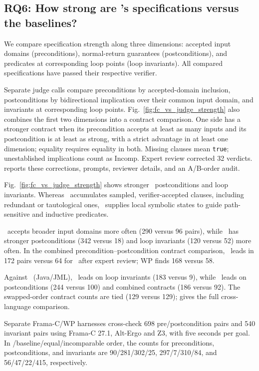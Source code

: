 \subsection{RQ6: How strong are \toolname's specifications versus the baselines?}
\label{subsec:rq6-strength}

{We compare specification strength along three dimensions: accepted input domains (preconditions), normal-return guarantees (postconditions), and predicates at corresponding loop points (loop invariants). All compared specifications have passed their respective verifier.}

\smallskip
{}
{Separate judge calls compare preconditions by accepted-domain inclusion, postconditions by bidirectional implication over their common input domain, and invariants at corresponding loop points. Fig.~\ref{fig:fc_vs_judge_strength} also combines the first two dimensions into a contract comparison. One side has a stronger contract when its precondition accepts at least as many inputs and its postcondition is at least as strong, with a strict advantage in at least one dimension; equality requires equality in both. Missing clauses mean \texttt{true}; unestablished implications count as Incomp. Expert review corrected 32 verdicts.  reports these corrections, prompts, reviewer details, and an A/B-order audit.}

{Fig.~\ref{fig:fc_vs_judge_strength} shows stronger \toolname\ postconditions and loop invariants. Whereas \autospec\ accumulates sampled, verifier-accepted clauses, including redundant or tautological ones, \toolname\ supplies local symbolic states to guide path-sensitive and inductive predicates.}

{\autospec\ accepts broader input domains more often (290 versus 96 pairs), while \toolname\ has stronger postconditions (342 versus 18) and loop invariants (120 versus 52) more often. In the combined precondition--postcondition contract comparison, \toolname\ leads in 172 pairs versus 64 for \autospec\ after expert review; WP finds 168 versus 58.}

{Against \specgen\ (Java/JML), \toolname\ leads on loop invariants (183 versus 9), while \specgen\ leads on postconditions (244 versus 100) and combined contracts (186 versus 92). The swapped-order contract counts are tied (129 versus 129);  gives the full cross-language comparison.}

\smallskip
{}
{Separate Frama-C/WP harnesses cross-check 698 pre/postcondition pairs
and 540 invariant pairs using Frama-C 27.1, Alt-Ergo and Z3, with five
seconds per goal. In \toolname/baseline/equal/incomparable order, the counts
for preconditions, postconditions, and invariants are 90/281/302/25,
297/7/310/84, and 56/47/22/415, respectively.}

